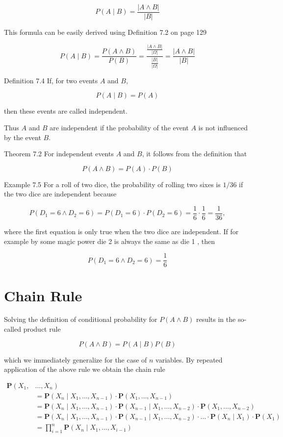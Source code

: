 \documentclass[10pt]{book}
\begin{document}
$$
P(A \mid B)=\frac{|A \wedge B|}{|B|}
$$

This formula can be easily derived using Definition 7.2 on page 129

$$
P(A \mid B)=\frac{P(A \wedge B)}{P(B)}=\frac{\frac{|A \wedge B|}{|\Omega|}}{\frac{|B|}{|\Omega|}}=\frac{|A \wedge B|}{|B|}
$$

Definition 7.4 If, for two events $A$ and $B$,

$$
P(A \mid B)=P(A)
$$

then these events are called independent.

Thus $A$ and $B$ are independent if the probability of the event $A$ is not influenced by the event $B$.

Theorem 7.2 For independent events $A$ and $B$, it follows from the definition that

$$
P(A \wedge B)=P(A) \cdot P(B)
$$

Example 7.5 For a roll of two dice, the probability of rolling two sixes is $1 / 36$ if the two dice are independent because

$$
P\left(D_{1}=6 \wedge D_{2}=6\right)=P\left(D_{1}=6\right) \cdot P\left(D_{2}=6\right)=\frac{1}{6} \cdot \frac{1}{6}=\frac{1}{36},
$$

where the first equation is only true when the two dice are independent. If for example by some magic power die 2 is always the same as die 1 , then

$$
P\left(D_{1}=6 \wedge D_{2}=6\right)=\frac{1}{6}
$$

\section*{Chain Rule}
Solving the definition of conditional probability for $P(A \wedge B)$ results in the so-called product rule

$$
P(A \wedge B)=P(A \mid B) P(B)
$$

which we immediately generalize for the case of $n$ variables. By repeated application of the above rule we obtain the chain rule


\begin{align*}
\boldsymbol{P}\left(X_{1},\right. & \left.\ldots, X_{n}\right) \\
& =\boldsymbol{P}\left(X_{n} \mid X_{1}, \ldots, X_{n-1}\right) \cdot \boldsymbol{P}\left(X_{1}, \ldots, X_{n-1}\right) \\
& =\boldsymbol{P}\left(X_{n} \mid X_{1}, \ldots, X_{n-1}\right) \cdot \boldsymbol{P}\left(X_{n-1} \mid X_{1}, \ldots, X_{n-2}\right) \cdot \boldsymbol{P}\left(X_{1}, \ldots, X_{n-2}\right) \\
& =\boldsymbol{P}\left(X_{n} \mid X_{1}, \ldots, X_{n-1}\right) \cdot \boldsymbol{P}\left(X_{n-1} \mid X_{1}, \ldots, X_{n-2}\right) \cdot \ldots \cdot \boldsymbol{P}\left(X_{n} \mid X_{1}\right) \cdot \boldsymbol{P}\left(X_{1}\right) \\
& =\prod_{i=1}^{n} \boldsymbol{P}\left(X_{n} \mid X_{1}, \ldots, X_{i-1}\right) \tag{7.1}
\end{align*}
\end{document}
